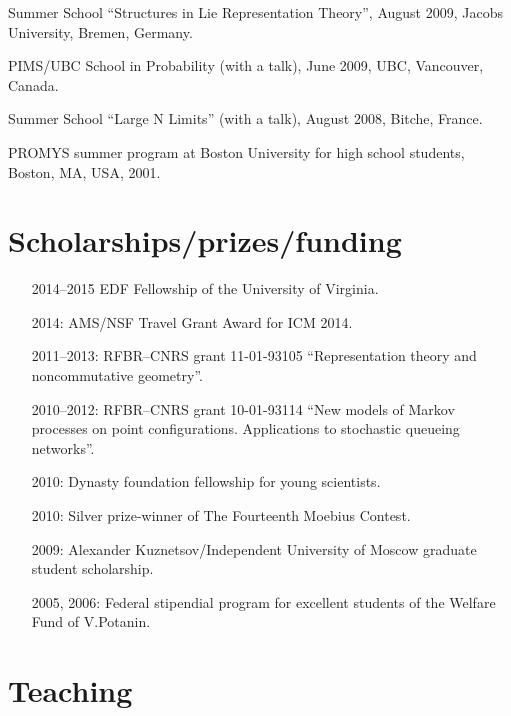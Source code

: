 \documentclass[letterpaper,11pt]{article}
\begin{document}
\begin{etaremune}
\item Summer School ``Structures in Lie Representation Theory'', August 2009, Jacobs University, Bremen, Germany. 

\item PIMS/UBC School in Probability (with a talk), June 2009, UBC, Vancouver, Canada. 

\item 
Summer School ``Large N Limits'' (with a talk), August 2008, Bitche, France. 

\item PROMYS summer program at Boston University for high school students, Boston, MA, USA, 2001.
\end{etaremune}

\section*{Scholarships/prizes/funding}
\begin{itemize}
  \item[2014--2015] EDF Fellowship of the University of Virginia. 

  \item[2014:] AMS/NSF Travel Grant Award for ICM 2014.

  \item[2011--2013:] RFBR--CNRS grant 11-01-93105 ``Representation theory and noncommutative geometry''.
  
  \item[2010--2012:] RFBR--CNRS grant 10-01-93114 ``New models of Markov processes on point configurations. Applications to stochastic queueing networks''.

  \item[2010:] Dynasty foundation fellowship for young scientists.
    
  \item[2010:] Silver prize-winner of The Fourteenth Moebius Contest.

  \item[2009:] Alexander Kuznetsov/Independent University of Moscow graduate student scholarship.

  \item[2005, 2006:] Federal stipendial program for excellent students of the Welfare Fund of V.Potanin.
\end{itemize}


\section*{Teaching}
\end{document}
